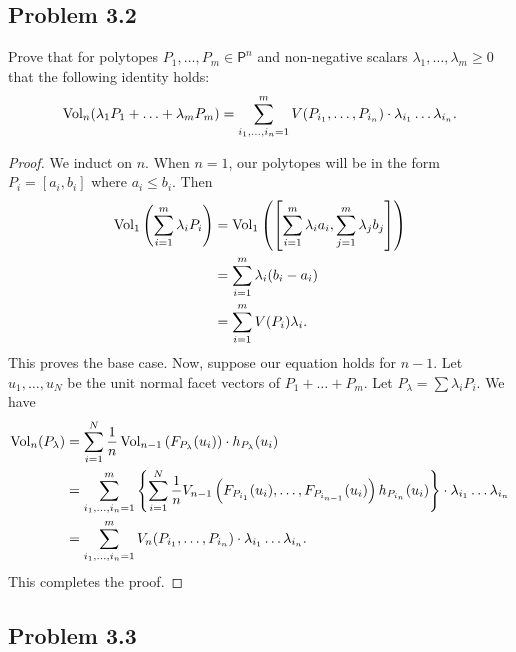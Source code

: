 \documentclass[12pt]{article}
\begin{document}
\newpage 

\subsection{Problem 3.2}

\begin{problem} \label{problem-3.2}
	Prove that for polytopes $P_1, \ldots, P_m \in \mathsf{P}^n$ and non-negative scalars $\lambda_1, \ldots, \lambda_m \geq 0$ that the following identity holds:
    \[
        \operatorname{Vol}_n(\lambda_1 P_1 + \ldots + \lambda_m P_m) = \sum_{i_1, \ldots, i_n = 1}^m V(P_{i_1}, \ldots, P_{i_n}) \cdot \lambda_{i_1} \ldots \lambda_{i_n}.
    \]   
\end{problem}

\begin{proof}
	We induct on $n$. When $n = 1$, our polytopes will be in the form $P_i = [a_i, b_i]$ where $a_i \leq b_i$. Then 
	\begin{align*}
		\operatorname{Vol}_1 \left ( \sum_{i = 1}^m \lambda_i P_i \right ) & = \operatorname{Vol}_1 \left ( \left [ \sum_{i = 1}^m \lambda_i a_i, \sum_{j = 1}^m \lambda_j b_j \right ] \right ) \\
		& = \sum_{i = 1}^m \lambda_i (b_i - a_i) \\
		& = \sum_{i = 1}^m V(P_i) \lambda_i. 
	\end{align*}
	This proves the base case. Now, suppose our equation holds for $n-1$. Let $u_1, \ldots, u_N$ be the unit normal facet vectors of $P_1 + \ldots + P_m$. Let $P_\lambda = \sum \lambda_i P_i$. We have 
	\begin{align*}
		\operatorname{Vol}_n (P_\lambda) & = \sum_{i = 1}^N \frac{1}{n} \operatorname{Vol}_{n-1} \left (F_{P_\lambda} (u_i) \right ) \cdot h_{P_\lambda}(u_i) \\
		& = \sum_{i_1, \ldots, i_n = 1}^m \left \{ \sum_{i = 1}^N \frac{1}{n} V_{n-1}\left (F_{P_{i_1}}(u_i), \ldots, F_{P_{i_{n-1}}}(u_i) \right ) h_{P_{i_n}}(u_i) \right \} \cdot \lambda_{i_1} \ldots \lambda_{i_n} \\
		& = \sum_{i_1, \ldots, i_n = 1}^m V_n(P_{i_1}, \ldots, P_{i_{n}}) \cdot \lambda_{i_1} \ldots \lambda_{i_n}.
	\end{align*}
	This completes the proof. 
\end{proof}

\newpage 

\subsection{Problem 3.3}
\end{document}
